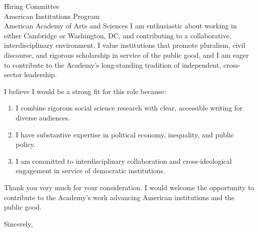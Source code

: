 \documentclass[11pt,letterpaper]{letter}
\begin{document}
\begin{letter}{
Hiring Committee \\
American Institutions Program \\
American Academy of Arts and Sciences
}
I am enthusiastic about working in either Cambridge or Washington, DC, and contributing to a collaborative, interdisciplinary environment. I value institutions that promote pluralism, civil discourse, and rigorous scholarship in service of the public good, and I am eager to contribute to the Academy’s long-standing tradition of independent, cross-sector leadership.

I believe I would be a strong fit for this role because:
\begin{enumerate}
    \item I combine rigorous social science research with clear, accessible writing for diverse audiences.
    \item I have substantive expertise in political economy, inequality, and public policy.
    \item I am committed to interdisciplinary collaboration and cross-ideological engagement in service of democratic institutions.
\end{enumerate}

Thank you very much for your consideration. I would welcome the opportunity to contribute to the Academy’s work advancing American institutions and the public good.

\closing{Sincerely,}

\end{letter}
\end{document}
